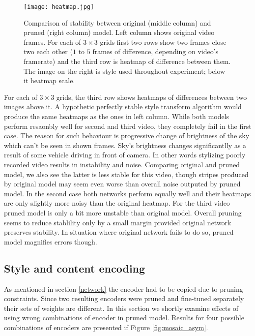 \documentclass[../Main.tex]{subfiles}
\begin{document}
\begin{figure}[h!]
\centering
    \texttt{[image: heatmap.jpg]}
    \caption{Comparison of stability between original (middle column) and pruned
    (right column) model. Left column shows original video frames. For each of
    $3\times3$ grids first two rows show two frames close two each other
    ($1$ to $5$ frames of difference, depending on video's framerate) and the third
    row is heatmap of difference between them. The image on the right is style used
    throughout experiment; below it heatmap scale.
    }
    \label{fig:heatmap}
\end{figure} 

For each of $3\times3$ grids, the third row shows heatmaps of differences between 
two images above it. A hypothetic perfectly stable style transform algorithm would
produce the same heatmaps as the ones in left column. While both models perform
resaonbly well for second and third video, they completely fail in the first case.
The reason for such behaviour is progressive change of brightness of the sky
which can't be seen in shown frames. Sky's brightness changes significantlly 
as a result of some vehicle driving in front of camera. In other words
stylizing poorly recorded video results in instability and noise. Comparing
original and pruned model, we also see the latter is less stable for this video,
though stripes produced by original model may seem even worse than overall
noise outputed by pruned model. In the second case both networks perform equally well
and their heatmaps are only slightly more noisy than the original heatmap.
For the third video pruned model is only a bit more unstable than original model.
Overall pruning seems to reduce stablility only by a small margin provided original network
preserves stability. In situation where original network fails to do so, pruned model
magnifies errors though.


\subsection{Style and content encoding} \label{two_encoders}
As mentioned in section \ref{network} the encoder had to be copied due to pruning
constraints. Since two resulting encoders were pruned and fine-tuned separately 
their sets of weights are different. In this section we shortly examine effects
of using wrong combinations of encoder in pruned model. Results for four possible combinations
of encoders are presented if Figure \ref{fig:mosaic_asym}.
\end{document}
